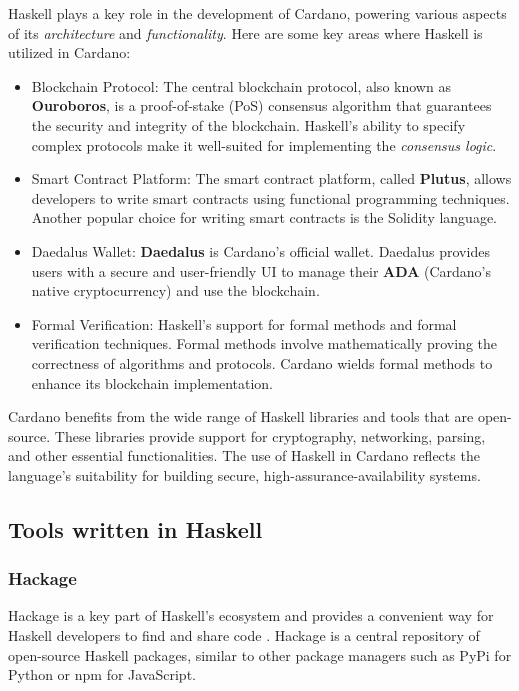 \documentclass[a4paper, titlepage, twoside]{article}
\begin{document}
Haskell plays a key role in the development of Cardano, powering various aspects of its \emph{architecture} and \emph{functionality}. Here are some key areas where Haskell is utilized in Cardano:

\begin{itemize}
\item Blockchain Protocol: The central blockchain protocol, also known as \textbf{Ouroboros}, is a proof-of-stake (PoS) consensus algorithm that guarantees the security and integrity of the blockchain. Haskell's ability to specify complex protocols make it well-suited for implementing the \emph{consensus logic}.

\item Smart Contract Platform: The smart contract platform, called \textbf{Plutus}, allows developers to write smart contracts using functional programming techniques. Another popular choice for writing smart contracts is the Solidity language.

\item Daedalus Wallet: \textbf{Daedalus} is Cardano's official wallet. Daedalus provides users with a secure and user-friendly UI to manage their \textbf{ADA} (Cardano's native cryptocurrency) and use the blockchain.

\item Formal Verification: Haskell's support for formal methods and formal verification techniques. Formal methods involve mathematically proving the correctness of algorithms and protocols. Cardano wields formal methods to enhance its blockchain implementation.
\end{itemize}

Cardano benefits from the wide range of Haskell libraries and tools that are open-source. These libraries provide support for cryptography, networking, parsing, and other essential functionalities. The use of Haskell in Cardano reflects the language's suitability for building secure, high-assurance-availability systems.

\subsection{Tools written in Haskell}
\label{sec:orgd12159f}

\subsubsection{Hackage}
\label{sec:org4ce42cd}

Hackage is a key part of Haskell's ecosystem and provides a convenient way for Haskell developers to find and share code \autocite{hackageHackage2023}. Hackage is a central repository of open-source Haskell packages, similar to other package managers such as PyPi for Python or npm for JavaScript.
\end{document}
